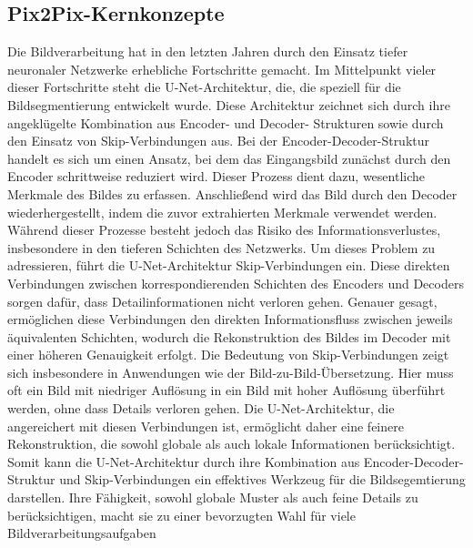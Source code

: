\subsection{Pix2Pix-Kernkonzepte}
Die Bildverarbeitung hat in den letzten Jahren durch den Einsatz tiefer neuronaler Netzwerke erhebliche Fortschritte gemacht. Im Mittelpunkt vieler dieser Fortschritte steht die U-Net-Architektur, die, die speziell für die Bildsegmentierung entwickelt wurde. Diese Architektur zeichnet sich durch ihre angeklügelte Kombination aus Encoder- und Decoder- Strukturen sowie durch den Einsatz von Skip-Verbindungen aus. \newline
Bei der Encoder-Decoder-Struktur handelt es sich um einen Ansatz, bei dem das Eingangsbild zunächst durch den Encoder schrittweise reduziert wird. Dieser Prozess dient dazu, wesentliche Merkmale des Bildes zu erfassen. Anschließend wird das Bild durch den Decoder wiederhergestellt, indem die zuvor extrahierten Merkmale verwendet werden. Während dieser Prozesse besteht jedoch das Risiko des Informationsverlustes, insbesondere in den tieferen Schichten des Netzwerks.
Um dieses Problem zu adressieren, führt die U-Net-Architektur Skip-Verbindungen ein. Diese direkten Verbindungen zwischen korrespondierenden Schichten des Encoders und Decoders sorgen dafür, dass Detailinformationen nicht verloren gehen. Genauer gesagt, ermöglichen diese Verbindungen den direkten Informationsfluss zwischen jeweils äquivalenten Schichten, wodurch die Rekonstruktion des Bildes im Decoder mit einer höheren Genauigkeit erfolgt. \newline
Die Bedeutung von Skip-Verbindungen zeigt sich insbesondere in Anwendungen wie der Bild-zu-Bild-Übersetzung. Hier muss oft ein Bild mit niedriger Auflösung in ein Bild mit hoher Auflösung überführt werden, ohne dass Details verloren gehen. Die U-Net-Architektur, die angereichert mit diesen Verbindungen ist, ermöglicht daher eine feinere Rekonstruktion, die sowohl globale als auch lokale Informationen berücksichtigt. \newline
Somit kann die U-Net-Architektur durch ihre Kombination aus Encoder-Decoder-Struktur und Skip-Verbindungen ein effektives Werkzeug für die Bildsegemtierung darstellen. Ihre Fähigkeit, sowohl globale Muster als auch feine Details zu berücksichtigen, macht sie zu einer bevorzugten Wahl für viele Bildverarbeitungsaufgaben

